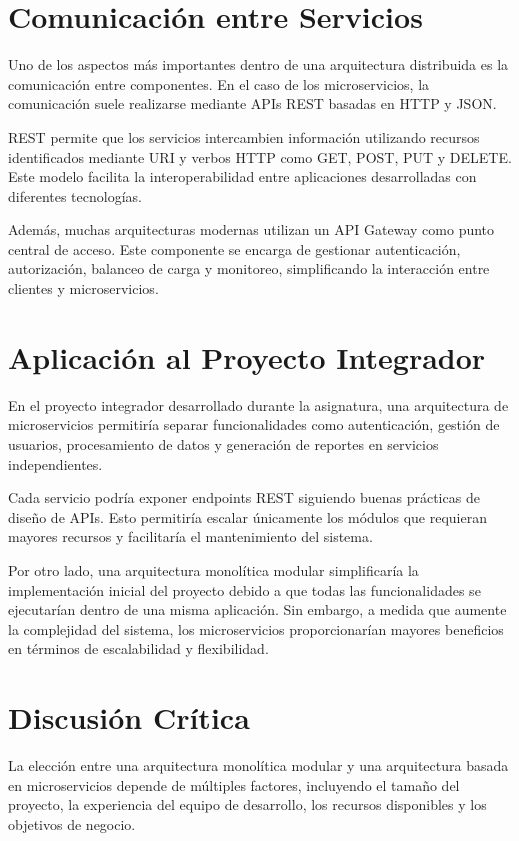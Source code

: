 \documentclass[12pt,a4paper]{article}
\begin{document}
\section{Comunicación entre Servicios}

Uno de los aspectos más importantes dentro de una arquitectura distribuida es la comunicación entre componentes. En el caso de los microservicios, la comunicación suele realizarse mediante APIs REST basadas en HTTP y JSON.

REST permite que los servicios intercambien información utilizando recursos identificados mediante URI y verbos HTTP como GET, POST, PUT y DELETE. Este modelo facilita la interoperabilidad entre aplicaciones desarrolladas con diferentes tecnologías.

Además, muchas arquitecturas modernas utilizan un API Gateway como punto central de acceso. Este componente se encarga de gestionar autenticación, autorización, balanceo de carga y monitoreo, simplificando la interacción entre clientes y microservicios.

\section{Aplicación al Proyecto Integrador}

En el proyecto integrador desarrollado durante la asignatura, una arquitectura de microservicios permitiría separar funcionalidades como autenticación, gestión de usuarios, procesamiento de datos y generación de reportes en servicios independientes.

Cada servicio podría exponer endpoints REST siguiendo buenas prácticas de diseño de APIs. Esto permitiría escalar únicamente los módulos que requieran mayores recursos y facilitaría el mantenimiento del sistema.

Por otro lado, una arquitectura monolítica modular simplificaría la implementación inicial del proyecto debido a que todas las funcionalidades se ejecutarían dentro de una misma aplicación. Sin embargo, a medida que aumente la complejidad del sistema, los microservicios proporcionarían mayores beneficios en términos de escalabilidad y flexibilidad.

\section{Discusión Crítica}

La elección entre una arquitectura monolítica modular y una arquitectura basada en microservicios depende de múltiples factores, incluyendo el tamaño del proyecto, la experiencia del equipo de desarrollo, los recursos disponibles y los objetivos de negocio.
\end{document}
